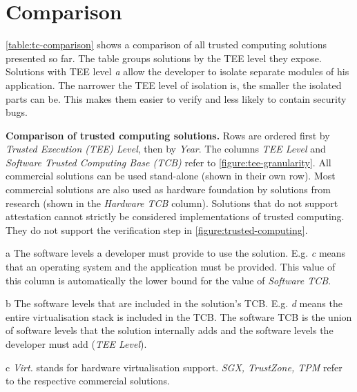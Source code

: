 \section{Comparison\label{ID_995120664}}
\autoref{table:tc-comparison} shows a comparison of all trusted computing solutions presented so far.\label{ID_31031823}
The table groups solutions by the TEE level they expose. Solutions with TEE level \textit{a} allow the developer to isolate separate modules of his application.\label{ID_1205678557}
The narrower the TEE level of isolation is, the smaller the isolated parts can be. This makes them easier to verify and less likely to contain security bugs.\label{ID_1993411071}

\begin{table}
\centering
\begin{threeparttable}

\caption{
\textbf{Comparison of trusted computing solutions.}\label{ID_1431047162}
Rows are ordered first by \textit{Trusted Execution (TEE) Level}, then by \textit{Year}. The columns \textit{TEE Level} and \textit{Software Trusted Computing Base (TCB)} refer to \autoref{figure:tee-granularity}.\label{ID_1895412115}
All commercial solutions can be used stand-alone (shown in their own row). Most commercial solutions are also used as hardware foundation by solutions from research (shown in the \textit{Hardware TCB} column).\label{ID_1108934633}
Solutions that do not support attestation cannot strictly be considered implementations of trusted computing. They do not support the verification step in \autoref{figure:trusted-computing}.\label{ID_946982666}
}
\label{table:tc-comparison}\label{ID_925340590}
\begin{tablenotes}\label{ID_1070677592}
\item[a] The software levels a developer must provide to use the solution. E.g. \textit{c} means that an operating system and the application must be provided. This value of this column is automatically the lower bound for the value of \textit{Software TCB}.\label{ID_429242638}
\item[b] The software levels that are included in the solution's TCB. E.g. \textit{d} means the entire virtualisation stack is included in the TCB. The software TCB is the union of software levels that the solution internally adds and the software levels the developer must add (\textit{TEE Level}).\label{ID_1226934143}
\item[c] \textit{Virt.} stands for hardware virtualisation support. \textit{SGX, TrustZone, TPM} refer to the respective commercial solutions.\label{ID_1945080258}
\end{tablenotes}\label{ID_1977590267}
\end{threeparttable}
\end{table}
